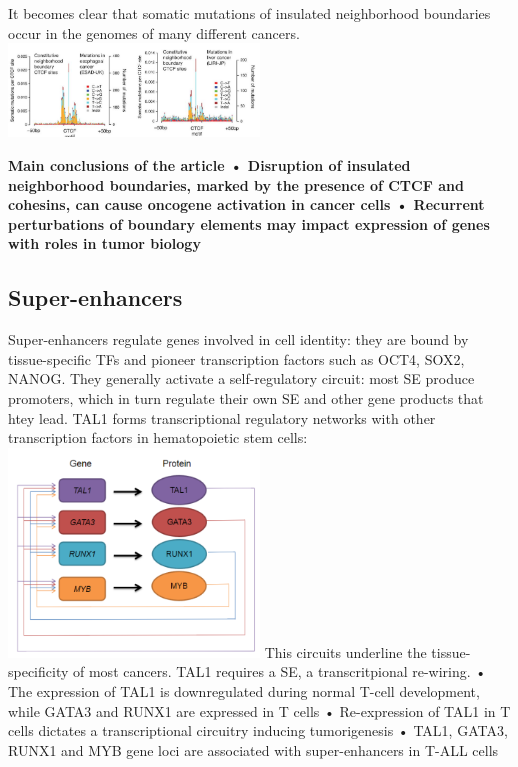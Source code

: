 It becomes clear that somatic mutations of insulated neighborhood boundaries occur in the genomes of many different cancers.
\includegraphics[width=0.5\textwidth]{../_resources/03aab7349f83323cba1c91cb2c3e3124.png}

\textbf{Main conclusions of the article
• Disruption of insulated neighborhood boundaries, marked by the presence of CTCF and cohesins,
can cause oncogene activation in cancer cells
• Recurrent perturbations of boundary elements may impact expression of genes with roles in
tumor biology}

\hypertarget{super-enhancers}{%
\subsection{Super-enhancers}\label{super-enhancers}}

Super-enhancers regulate genes involved in cell identity: they are bound by tissue-specific TFs and pioneer transcription factors such as OCT4, SOX2, NANOG. They generally activate a self-regulatory circuit: most SE produce promoters, which in turn regulate their own SE and other gene products that htey lead.
TAL1 forms transcriptional regulatory networks with other transcription factors in hematopoietic stem cells:
\includegraphics[width=0.5\textwidth]{../_resources/99fbd93b812d482263d53c442698a36a.png}
This circuits underline the tissue-specificity of most cancers. TAL1 requires a SE, a transcritpional re-wiring.
• The expression of TAL1 is downregulated during normal T-cell development, while GATA3 and RUNX1 are expressed in T cells
• Re-expression of TAL1 in T cells dictates a transcriptional circuitry inducing tumorigenesis
• TAL1, GATA3, RUNX1 and MYB gene loci are associated with super-enhancers in T-ALL cells

